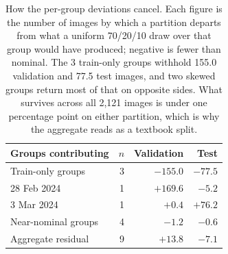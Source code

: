 \begin{table}[t]
  \centering
  \caption{How the per-group deviations cancel. Each figure is the number of images by which a partition departs from what a uniform 70/20/10 draw over that group would have produced; negative is fewer than nominal. The 3 train-only groups withhold 155.0 validation and 77.5 test images, and two skewed groups return most of that on opposite sides. What survives across all 2,121 images is under one percentage point on either partition, which is why the aggregate reads as a textbook split.}
  \label{tab:allocation-deviation}
  \begin{tabular}{lrrr}
    \toprule
    Groups contributing & $n$ & Validation & Test \\
    \midrule
    Train-only groups & 3 & $-155.0$ & $-77.5$ \\
    28 Feb 2024 & 1 & $+169.6$ & $-5.2$ \\
    3 Mar 2024 & 1 & $+0.4$ & $+76.2$ \\
    Near-nominal groups & 4 & $-1.2$ & $-0.6$ \\
    \midrule
    Aggregate residual & 9 & $+13.8$ & $-7.1$ \\
    \bottomrule
  \end{tabular}
\end{table}
